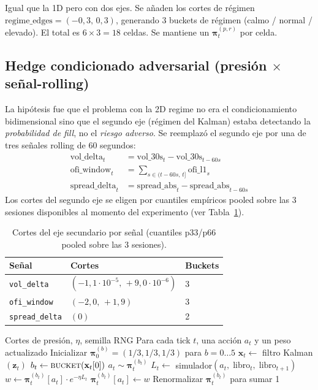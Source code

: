 \documentclass[journal,onecolumn,11pt]{IEEEtran}
\newcommand{\xv}{\mathbf{x}}
\newcommand{\zv}{\mathbf{z}}
\begin{document}
Igual que la 1D pero con dos ejes. Se añaden los cortes de régimen
$\text{regime\_edges}=(-0{,}3,\,0{,}3)$, generando 3 buckets de régimen
(calmo / normal / elevado). El total es $6\!\times\!3=18$ celdas. Se
mantiene un $\bm{\pi}^{(p,r)}_t$ por celda.

\subsection{Hedge condicionado adversarial (presión $\times$ señal-rolling)}

La hipótesis fue que el problema con la 2D regime no era el
condicionamiento bidimensional sino que el segundo eje (régimen
del Kalman) estaba detectando la \emph{probabilidad de fill}, no el
\emph{riesgo adverso}. Se reemplazó el segundo eje por una de tres
señales rolling de 60 segundos:
\begin{align}
\text{vol\_delta}_t &= \text{vol\_30s}_t - \text{vol\_30s}_{t-60s}\\
\text{ofi\_window}_t &= \sum_{s\in(t-60s,\,t]} \text{ofi\_l1}_s\\
\text{spread\_delta}_t &= \text{spread\_abs}_t - \text{spread\_abs}_{t-60s}
\end{align}
Los cortes del segundo eje se eligen por cuantiles empíricos pooled
sobre las 3 sesiones disponibles al momento del experimento (ver
Tabla~\ref{tab:cuts-secondaria}).

\begin{table}[!htbp]
\caption{Cortes del eje secundario por señal (cuantiles p33/p66
         pooled sobre las 3 sesiones).}
\label{tab:cuts-secondaria}
\centering\small
\begin{tabular}{lll}
\toprule
Señal & Cortes & Buckets \\
\midrule
\texttt{vol\_delta}    & $(-1{,}1\!\cdot\!10^{-5},\,+9{,}0\!\cdot\!10^{-6})$ & 3 \\
\texttt{ofi\_window}   & $(-2{,}0,\,+1{,}9)$                                 & 3 \\
\texttt{spread\_delta} & $(0)$                                               & 2 \\
\bottomrule
\end{tabular}
\end{table}

\begin{algorithm}[!htbp]
\caption{Hedge bucketed (versión 1D, pseudo-código).}
\label{alg:hedge1d}
\begin{algorithmic}[1]
\Require Cortes de presión, $\eta$, semilla RNG
\Ensure  Para cada tick $t$, una acción $a_t$ y un peso actualizado
\State Inicializar $\bm{\pi}^{(b)}_0 = (1/3, 1/3, 1/3)$ para $b=0\ldots 5$
  \State $\xv_t \gets$ filtro Kalman$(\zv_t)$
  \State $b_t \gets \textsc{bucket}(\xv_t[0])$
  \State $a_t \sim \bm{\pi}^{(b_t)}_t$
  \State $L_t \gets$ simulador$(a_t,\;\text{libro}_t,\;\text{libro}_{t+1})$
  \State $w \gets \bm{\pi}^{(b_t)}_t[a_t] \cdot e^{-\eta L_t}$
  \State $\bm{\pi}^{(b_t)}_t[a_t] \gets w$
  \State Renormalizar $\bm{\pi}^{(b_t)}_t$ para sumar 1
\EndFor
\end{algorithmic}
\end{algorithm}
\end{document}
